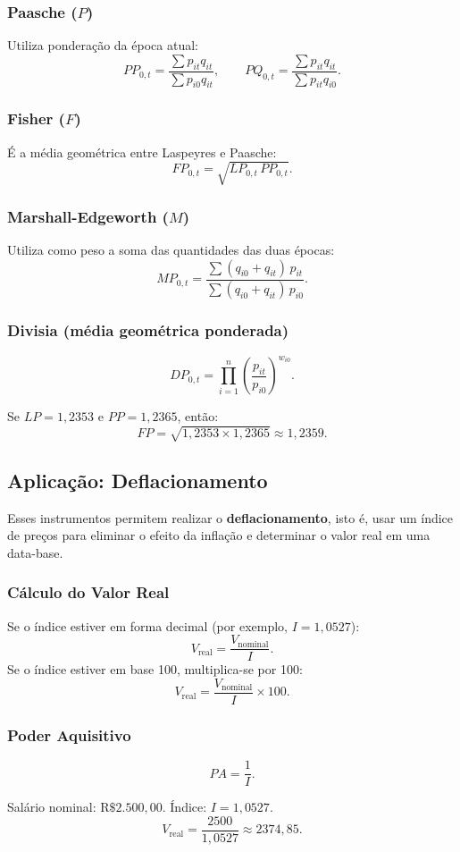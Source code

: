 \subsubsection*{Paasche ($P$)}

Utiliza ponderação da época atual:
\[
PP_{0,t}=\frac{\sum p_{it}q_{it}}{\sum p_{i0}q_{it}},
\qquad
PQ_{0,t}=\frac{\sum p_{it}q_{it}}{\sum p_{it}q_{i0}}.
\]

\subsubsection*{Fisher ($F$)}

É a média geométrica entre Laspeyres e Paasche:
\[
FP_{0,t}=\sqrt{LP_{0,t}\,PP_{0,t}}.
\]

\subsubsection*{Marshall-Edgeworth ($M$)}

Utiliza como peso a soma das quantidades das duas épocas:
\[
MP_{0,t}=\frac{\sum (q_{i0}+q_{it})\,p_{it}}{\sum (q_{i0}+q_{it})\,p_{i0}}.
\]

\subsubsection*{Divisia (média geométrica ponderada)}

\[
DP_{0,t}=\prod_{i=1}^{n}\left(\frac{p_{it}}{p_{i0}}\right)^{w_{i0}}.
\]

\begin{example}
    Se \(LP=1{,}2353\) e \(PP=1{,}2365\), então:
\[
FP=\sqrt{1{,}2353\times 1{,}2365}\approx 1{,}2359.
\]
\end{example}

\subsection{Aplicação: Deflacionamento}

Esses instrumentos permitem realizar o \textbf{deflacionamento}, isto é, usar um índice de preços para eliminar o efeito da inflação e determinar o valor real em uma data-base.

\subsubsection*{Cálculo do Valor Real}

Se o índice estiver em forma decimal (por exemplo, \(I=1,0527\)):
\[
V_{\text{real}}=\frac{V_{\text{nominal}}}{I}.
\]
Se o índice estiver em base 100, multiplica-se por 100:
\[
V_{\text{real}}=\frac{V_{\text{nominal}}}{I}\times 100.
\]

\subsubsection*{Poder Aquisitivo}

\[
PA=\frac{1}{I}.
\]

\begin{example}
    Salário nominal: \(\text{R\$ }2.500,00\). \quad Índice: \(I=1{,}0527\).
    \[
    V_{\text{real}}=\frac{2500}{1,0527}\approx 2374,85.
    \]
\end{example}



